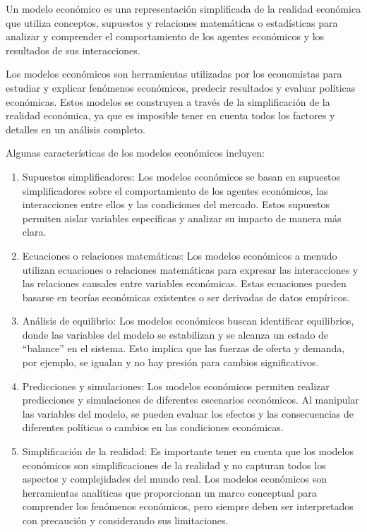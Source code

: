 \documentclass[
  jou,
  floatsintext,
  longtable,
  a4paper,
  nolmodern,
  notxfonts,
  notimes,
  12pt,
  colorlinks=true,linkcolor=blue,citecolor=blue,urlcolor=blue]{apa7}
\begin{document}
Un modelo económico es una representación simplificada de la realidad
económica que utiliza conceptos, supuestos y relaciones matemáticas o
estadísticas para analizar y comprender el comportamiento de los agentes
económicos y los resultados de sus interacciones.

Los modelos económicos son herramientas utilizadas por los economistas
para estudiar y explicar fenómenos económicos, predecir resultados y
evaluar políticas económicas. Estos modelos se construyen a través de la
simplificación de la realidad económica, ya que es imposible tener en
cuenta todos los factores y detalles en un análisis completo.

Algunas características de los modelos económicos incluyen:

\begin{enumerate}
\def\labelenumi{\arabic{enumi}.}
\item
  Supuestos simplificadores: Los modelos económicos se basan en
  supuestos simplificadores sobre el comportamiento de los agentes
  económicos, las interacciones entre ellos y las condiciones del
  mercado. Estos supuestos permiten aislar variables específicas y
  analizar su impacto de manera más clara.
\item
  Ecuaciones o relaciones matemáticas: Los modelos económicos a menudo
  utilizan ecuaciones o relaciones matemáticas para expresar las
  interacciones y las relaciones causales entre variables económicas.
  Estas ecuaciones pueden basarse en teorías económicas existentes o ser
  derivadas de datos empíricos.
\item
  Análisis de equilibrio: Los modelos económicos buscan identificar
  equilibrios, donde las variables del modelo se estabilizan y se
  alcanza un estado de ``balance'' en el sistema. Esto implica que las
  fuerzas de oferta y demanda, por ejemplo, se igualan y no hay presión
  para cambios significativos.
\item
  Predicciones y simulaciones: Los modelos económicos permiten realizar
  predicciones y simulaciones de diferentes escenarios económicos. Al
  manipular las variables del modelo, se pueden evaluar los efectos y
  las consecuencias de diferentes políticas o cambios en las condiciones
  económicas.
\item
  Simplificación de la realidad: Es importante tener en cuenta que los
  modelos económicos son simplificaciones de la realidad y no capturan
  todos los aspectos y complejidades del mundo real. Los modelos
  económicos son herramientas analíticas que proporcionan un marco
  conceptual para comprender los fenómenos económicos, pero siempre
  deben ser interpretados con precaución y considerando sus
  limitaciones.
\end{enumerate}
\end{document}

